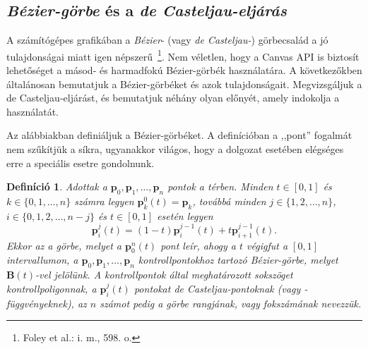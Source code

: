 \documentclass[12pt]{report}
\newtheorem{defi}[tét]{Definíció}
\theoremstyle{definition}
\begin{document}
    \subsection*{\emph{Bézier-görbe} és a \emph{de Casteljau-eljárás}}
    \label{sec:Bézier:de:Casteljau}

A számítógépes grafikában a \emph{Bézier}- (vagy \emph{de Casteljau-})
görbecsalád a jó tulajdonságai miatt igen népszerű~\footnote{Foley et al.: i.
m., 598. o.}. Nem véletlen, hogy a Canvas API is biztosít lehetőséget a másod-
és harmadfokú Bézier-görbék használatára. A következőkben általánosan
bemutatjuk a Bézier-görbéket és azok tulajdonságait. Megvizsgáljuk a de
Casteljau-eljárást, és bemutatjuk néhány olyan előnyét, amely indokolja a
használatát.

Az alábbiakban definiáljuk a Bézier-görbéket. A definícióban a ,,pont''
fogalmát nem szűkítjük a síkra, ugyanakkor világos, hogy a dolgozat esetében
elégséges erre a speciális esetre gondolnunk.

\begin{defi}\label{def:Bézier}\cite[Kurusa]{Kurusa:1999:szamitogepes} Adottak a
$\boldsymbol{p}_0,\boldsymbol{p}_1,\dots,\boldsymbol{p}_n$ pontok a térben.
Minden $t \in [0,1]$ és $k \in \{0,1,\dots,n\}$ számra legyen
$\boldsymbol{p}^0_k(t) = \boldsymbol{p}_k$, továbbá minden $j \in
\{1,2,\dots,n\}$, $i \in \{0,1,2,\dots,n-j\}$ és $t \in [0,1]$ esetén legyen
\[\boldsymbol{p}^j_i(t) = (1-t)\boldsymbol{p}^{j-1}_i(t) +
t\boldsymbol{p}^{j-1}_{i+1}(t).\] Ekkor az a görbe, melyet a
$\boldsymbol{p}^n_0(t)$ pont leír, ahogy a $t$ végigfut a $[0,1]$
intervallumon, a $\boldsymbol{p}_0,\boldsymbol{p}_1,\dots,\boldsymbol{p}_n$
\emph{kontrollpontokhoz} tartozó \emph{Bézier-görbe}, melyet
$\boldsymbol{B}(t)$-vel jelölünk. A kontrollpontok által meghatározott
sokszöget \emph{kontrollpoligonnak}, a $\boldsymbol{p}^j_i(t)$ pontokat
\emph{de Casteljau-pontoknak} (vagy \emph{-függvényeknek}), az $n$ számot pedig
a görbe \emph{rangjának}, vagy \emph{fokszámának} nevezzük.\end{defi}
\end{document}
